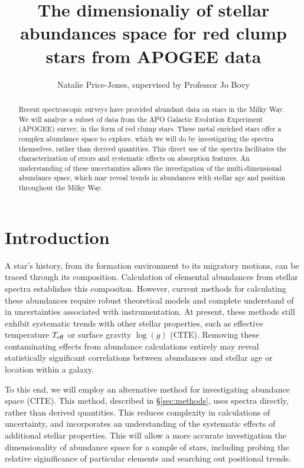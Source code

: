 \documentclass[preprint]{aastex}
\begin{document}
\title{The dimensionaliy of stellar abundances space for red clump stars from APOGEE data}
\author{Natalie Price-Jones, supervised by Professor Jo Bovy}

\begin{abstract}
Recent spectroscopic surveys have provided abundant data on stars in the Milky Way. We will analyze a subset of data from the APO Galactic Evolution Experiment (APOGEE) survey, in the form of red clump stars. These metal enriched stars offer a complex abundance space to explore, which we will do by investigating the spectra themselves, rather than derived quantities. This direct use of the spectra facilitates the characterization of errors and systematic effects on absorption features. An understanding of these uncertainties allows the investigation of the multi-dimensional abundance space, which may reveal trends in abundances with stellar age and position throughout the Milky Way.

\end{abstract}

\section{Introduction}
\label{sec:back}
A star's history, from its formation environment to its migratory motions, can be traced through its composition. Calculation of elemental abundances from stellar spectra establishes this compositon. However, current methods for calculating these abundances require robust theoretical models and complete understand of in uncertainties associated with instrumentation. At present, these methods still exhibit systematic trends with other stellar properties, such as effective temperature $T_{\rm eff}$ or surface gravity $\log(g)$ (CITE). Removing these contaminating effects from abundance calculations entirely may reveal statistically significant correlations between abundances and stellar age or location within a galaxy. 

To this end, we will employ an alternative method for investigating abundance space (CITE). This method, described in \S\ref{sec:methods}, uses spectra directly, rather than derived quantities. This reduces complexity in calculations of uncertainty, and incorporates an understanding of the systematic effects of additional stellar properties. This will allow a more accurate investigation the dimensionality of abundance space for a sample of stars, including probing the relative siginificance of particular elements and searching out positional trends.
\end{document}
